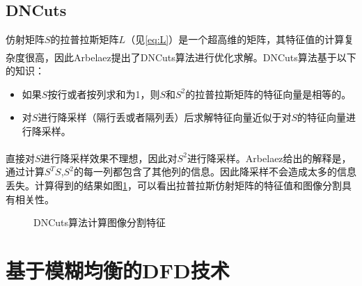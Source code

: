 \documentclass[UTF8]{ctexart}
\newcommand{\myciteup}[1]{\textsuperscript{\textsuperscript{\cite{#1}}}}
\begin{document}
\begin{sloppypar}
        \subsection{DNCuts}
        仿射矩阵$S$的拉普拉斯矩阵$L$（见\eqref{eq:L}）是一个超高维的矩阵，其特征值的计算复杂度很高，因此Arbelaez\myciteup{2014Multiscale}提出了DNCuts算法进行优化求解。DNCuts算法基于以下的知识：
        \begin{itemize}
            \item 如果$S$按行或者按列求和为1，则$S$和$S^2$的拉普拉斯矩阵的特征向量是相等的。
            \item 对$S$进行降采样（隔行丢或者隔列丢）后求解特征向量近似于对$S$的特征向量进行降采样。
        \end{itemize}
        直接对$S$进行降采样效果不理想，因此对$S^2$进行降采样。Arbelaez\myciteup{2014Multiscale}给出的解释是，通过计算$S^{T}S$,$S^2$的每一列都包含了其他列的信息。因此降采样不会造成太多的信息丢失。计算得到的结果如图\ref{fig:DNCuts}，可以看出拉普拉斯仿射矩阵的特征值和图像分割具有相关性。
        \begin{figure}[htbp]
            \centering
            \quad
            \quad
            \caption{\small DNCuts算法计算图像分割特征}
            \label{fig:DNCuts}
        \end{figure}
        \section{基于模糊均衡的DFD技术}

\end{sloppypar}
\end{document}
